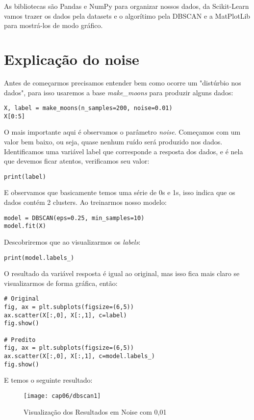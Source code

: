 As bibliotecas são Pandas e NumPy para organizar nossos dados, da Scikit-Learn vamos trazer os dados pela datasets e o algorítimo pela DBSCAN e a MatPlotLib para mostrá-los de modo gráfico.

\section{Explicação do noise}
Antes de começarmos precisamos entender bem como ocorre um "distúrbio nos dados", para isso usaremos a base \textit{make\_moons} para produzir alguns dados:
\begin{lstlisting}[]
X, label = make_moons(n_samples=200, noise=0.01)
X[0:5]
\end{lstlisting}

O mais importante aqui é observamos o parâmetro \textit{noise}. Começamos com um valor bem baixo, ou seja, quase nenhum ruído será produzido nos dados. Identificamos uma variável label que corresponde a resposta dos dados, e é nela que devemos ficar atentos, verificamos seu valor:
\begin{lstlisting}[]
print(label)
\end{lstlisting}

E observamos que basicamente temos uma série de 0s e 1s, isso indica que os dados contém 2 clusters. Ao treinarmos nosso modelo:
\begin{lstlisting}[]
model = DBSCAN(eps=0.25, min_samples=10)
model.fit(X)
\end{lstlisting}

Descobriremos que ao visualizarmos os \textit{labels}:
\begin{lstlisting}[]
print(model.labels_)
\end{lstlisting}

O resultado da variável resposta é igual ao original, mas isso fica mais claro se visualizarmos de forma gráfica, então:
\begin{lstlisting}[]
# Original
fig, ax = plt.subplots(figsize=(6,5))
ax.scatter(X[:,0], X[:,1], c=label)
fig.show()

# Predito
fig, ax = plt.subplots(figsize=(6,5))
ax.scatter(X[:,0], X[:,1], c=model.labels_)
fig.show()
\end{lstlisting}

E temos o seguinte resultado:
\begin{figure}[H]
	\centering
	\texttt{[image: cap06/dbscan1]}
	\caption{Visualização dos Resultados em Noise com 0,01}
\end{figure}

